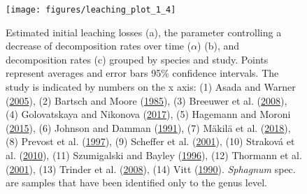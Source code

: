 \documentclass[
  12pt,
]{article}
\begin{document}
\begin{figure}[H]

{\centering \texttt{[image: figures/leaching\_plot\_1\_4]} 

}

\caption{Estimated initial leaching losses (a), the parameter controlling a decrease of decomposition rates over time (\(\alpha\)) (b), and decomposition rates (c) grouped by species and study. Points represent averages and error bars 95\% confidence intervals. The study is indicated by numbers on the x axis: (1) Asada and Warner (\protect\hyperlink{ref-Asada.2005b}{2005}), (2) Bartsch and Moore (\protect\hyperlink{ref-Bartsch.1985}{1985}), (3) Breeuwer et al. (\protect\hyperlink{ref-Breeuwer.2008}{2008}), (4) Golovatskaya and Nikonova (\protect\hyperlink{ref-Golovatskaya.2017}{2017}), (5) Hagemann and Moroni (\protect\hyperlink{ref-Hagemann.2015}{2015}), (6) Johnson and Damman (\protect\hyperlink{ref-Johnson.1991}{1991}), (7) Mäkilä et al. (\protect\hyperlink{ref-Makila.2018}{2018}), (8) Prevost et al. (\protect\hyperlink{ref-Prevost.1997}{1997}), (9) Scheffer et al. (\protect\hyperlink{ref-Scheffer.2001}{2001}), (10) Straková et al. (\protect\hyperlink{ref-Strakova.2010}{2010}), (11) Szumigalski and Bayley (\protect\hyperlink{ref-Szumigalski.1996}{1996}), (12) Thormann et al. (\protect\hyperlink{ref-Thormann.2001}{2001}), (13) Trinder et al. (\protect\hyperlink{ref-Trinder.2008}{2008}), (14) Vitt (\protect\hyperlink{ref-Vitt.1990}{1990}). \emph{Sphagnum} spec. are samples that have been identified only to the genus level.}\label{fig:out-mm36-1-p5}
\end{figure}
\end{document}
